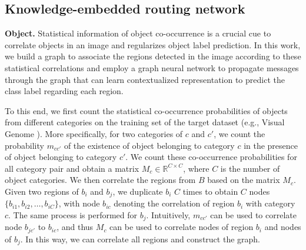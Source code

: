 \documentclass[10pt,twocolumn,letterpaper]{article}
\begin{document}
\subsection{Knowledge-embedded routing network}
\label{sec:spn}

\noindent\textbf{Object. }Statistical information of object co-occurrence is a crucial cue to correlate objects in an image and regularizes object label prediction. In this work, we build a graph to associate the regions detected in the image according to these statistical correlations and employ a graph neural network to propagate messages through the graph that can learn contextualized representation to predict the class label regarding each region.

To this end, we first count the statistical co-occurrence probabilities of objects from different categories on the training set of the target dataset (e.g., Visual Genome \cite{krishna2017visual}). More specifically, for two categories of $c$ and $c'$, we count the probability $m_{cc'}$ of the existence of object belonging to category $c$ in the presence of object belonging to category $c'$. We count these co-occurrence probabilities for all category pair and obtain a matrix $M_c \in \mathbb{R}^{C \times C}$, where $C$ is the number of object categories. We then correlate the regions from $B$ based on the matrix $M_c$. Given two regions of $b_i$ and $b_j$, we duplicate $b_i$ $C$ times to obtain $C$ nodes $\{b_{i1}, b_{i2}, \dots, b_{iC}\}$, with node $b_{ic}$ denoting the correlation of region $b_i$ with category $c$.  The same process is performed for $b_j$. Intuitively, $m_{{c}{c'}}$ can be used to correlate node $b_{j{c'}}$ to $b_{i{c}}$, and thus $M_c$ can be used to correlate nodes of region $b_i$ and nodes of $b_j$. In this way, we can correlate all regions and construct the graph.
\end{document}
